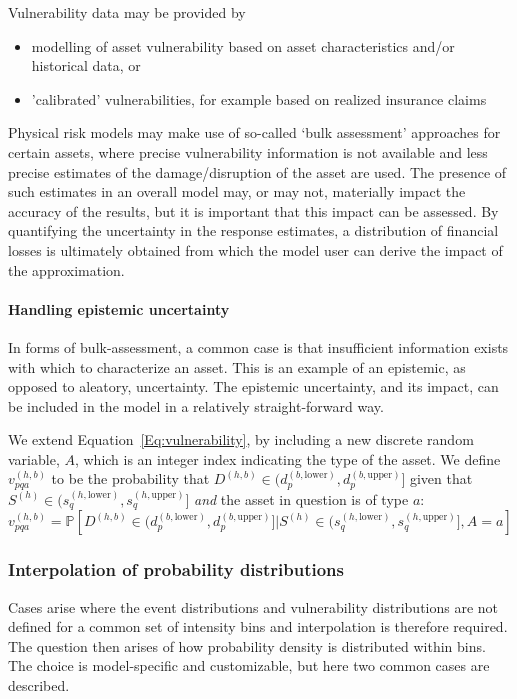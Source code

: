 \documentclass[a4paper,11pt]{extarticle} %
\begin{document}
Vulnerability data may be provided by
\begin{itemize}
    \item modelling of asset vulnerability based on asset characteristics and/or historical data, or
    \item 'calibrated' vulnerabilities, for example based on realized insurance claims
\end{itemize}
Physical risk models may make use of so-called `bulk assessment' approaches for certain assets, where precise vulnerability information is not available and less precise estimates of the damage/disruption of the asset are used. The presence of such estimates in an overall model may, or may not, materially impact the accuracy of the results, but it is important that this impact can be assessed. By quantifying the uncertainty in the response estimates, a distribution of financial losses is ultimately obtained from which the model user can derive the impact of the approximation.

\paragraph{Handling epistemic uncertainty}
In forms of bulk-assessment, a common case is that insufficient information exists with which to characterize an asset. This is an example of an epistemic, as opposed to aleatory, uncertainty. The epistemic uncertainty, and its impact, can be included in the model in a relatively straight-forward way.

We extend Equation~\ref{Eq:vulnerability}, by including a new discrete random variable, $A$, which is an integer index indicating the type of the asset. We define $v^{(h, b)}_{pqa}$ to be the probability that $D^{(h, b)} \in (d^{(b,\text{lower})}_p, d^{(b,\text{upper})}_p]$ given that $S^{(h)} \in (s^{(h, \text{lower})}_q, s^{(h, \text{upper})}_q]$ \emph{and} the asset in question is of type $a$:
\begin{equation}
    \label{Eq:vulnerability}
    v^{(h, b)}_{pqa} = \mathbb{P} \left[ D^{(h, b)} \in (d^{(b,\text{lower})}_p, d^{(b,\text{upper})}_p] | S^{(h)} \in (s^{(h, \text{lower})}_q, s^{(h, \text{upper})}_q], A = a \right]
\end{equation}


\subsubsection{Interpolation of probability distributions}
Cases arise where the event distributions and vulnerability distributions are not defined for a common set of intensity bins and interpolation is therefore required. The question then arises of how probability density is distributed within bins. The choice is model-specific and customizable, but here two common cases are described.
\end{document}
